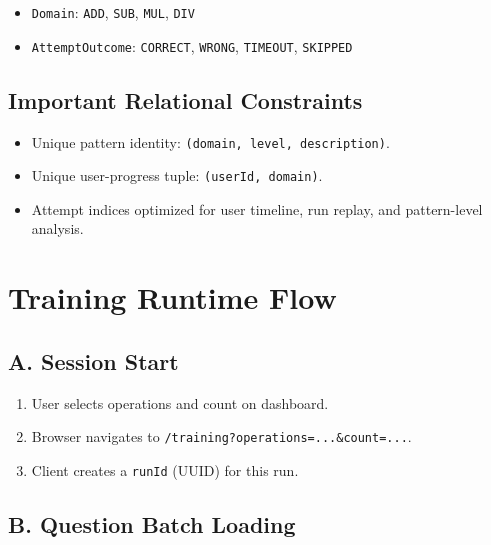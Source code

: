 \documentclass[11pt]{article}
\begin{document}
\begin{itemize}[leftmargin=*]
	\item \texttt{Domain}: \texttt{ADD}, \texttt{SUB}, \texttt{MUL}, \texttt{DIV}
	\item \texttt{AttemptOutcome}: \texttt{CORRECT}, \texttt{WRONG}, \texttt{TIMEOUT}, \texttt{SKIPPED}
\end{itemize}

\subsection*{Important Relational Constraints}

\begin{itemize}[leftmargin=*]
	\item Unique pattern identity: \texttt{(domain, level, description)}.
	\item Unique user-progress tuple: \texttt{(userId, domain)}.
	\item Attempt indices optimized for user timeline, run replay, and pattern-level analysis.
\end{itemize}

\section{Training Runtime Flow}

\subsection*{A. Session Start}

\begin{enumerate}[leftmargin=*]
	\item User selects operations and count on dashboard.
	\item Browser navigates to \texttt{/training?operations=...\&count=...}.
	\item Client creates a \texttt{runId} (UUID) for this run.
\end{enumerate}

\subsection*{B. Question Batch Loading}
\end{document}
